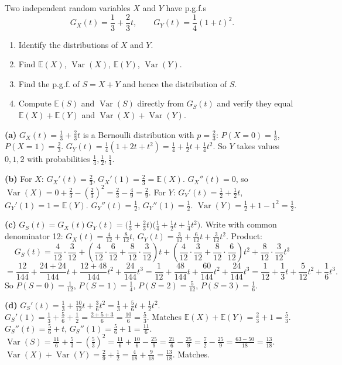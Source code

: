 \documentclass[11pt]{article}
\begin{document}
\begin{exoresolu}
Two independent random variables $X$ and $Y$ have p.g.f.s
\[
G_X(t) = \frac{1}{3} + \frac{2}{3}t, \qquad G_Y(t) = \frac{1}{4}(1+t)^2.
\]
\begin{enumerate}
\item Identify the distributions of $X$ and $Y$.
\item Find $\mathbb{E}(X)$, $\operatorname{Var}(X)$, $\mathbb{E}(Y)$, $\operatorname{Var}(Y)$.
\item Find the p.g.f. of $S=X+Y$ and hence the distribution of $S$.
\item Compute $\mathbb{E}(S)$ and $\operatorname{Var}(S)$ directly from $G_S(t)$ and verify they equal $\mathbb{E}(X)+\mathbb{E}(Y)$ and $\operatorname{Var}(X)+\operatorname{Var}(Y)$.
\end{enumerate}
\tcblower
\textbf{(a)} $G_X(t)=\frac{1}{3}+\frac{2}{3}t$ is a Bernoulli distribution with $p=\frac{2}{3}$: $P(X=0)=\frac{1}{3}$, $P(X=1)=\frac{2}{3}$.
$G_Y(t)=\frac{1}{4}(1+2t+t^2)=\frac{1}{4}+\frac{1}{2}t+\frac{1}{4}t^2$. So $Y$ takes values $0,1,2$ with probabilities $\frac{1}{4},\frac{1}{2},\frac{1}{4}$.

\textbf{(b)} For $X$: $G_X'(t)=\frac{2}{3}$, $G_X'(1)=\frac{2}{3}=\mathbb{E}(X)$. $G_X''(t)=0$, so $\operatorname{Var}(X)=0+\frac{2}{3}-(\frac{2}{3})^2=\frac{2}{3}-\frac{4}{9}=\frac{2}{9}$.
For $Y$: $G_Y'(t)=\frac{1}{2}+\frac{1}{2}t$, $G_Y'(1)=1=\mathbb{E}(Y)$. $G_Y''(t)=\frac{1}{2}$, $G_Y''(1)=\frac{1}{2}$. $\operatorname{Var}(Y)=\frac{1}{2}+1-1^2=\frac{1}{2}$.

\textbf{(c)} $G_S(t)=G_X(t)G_Y(t)=\bigl(\frac{1}{3}+\frac{2}{3}t\bigr)\bigl(\frac{1}{4}+\frac{1}{2}t+\frac{1}{4}t^2\bigr)$.
Write with common denominator 12:
$G_X(t) = \frac{4}{12} + \frac{8}{12}t$, \quad $G_Y(t) = \frac{3}{12} + \frac{6}{12}t + \frac{3}{12}t^2$.
Product:
\[
G_S(t) = \frac{4}{12}\cdot\frac{3}{12} + \left(\frac{4}{12}\cdot\frac{6}{12}+\frac{8}{12}\cdot\frac{3}{12}\right)t + \left(\frac{4}{12}\cdot\frac{3}{12}+\frac{8}{12}\cdot\frac{6}{12}\right)t^2 + \frac{8}{12}\cdot\frac{3}{12}t^3
\]
\[
= \frac{12}{144} + \frac{24+24}{144}t + \frac{12+48}{144}t^2 + \frac{24}{144}t^3
= \frac{1}{12} + \frac{48}{144}t + \frac{60}{144}t^2 + \frac{24}{144}t^3
= \frac{1}{12} + \frac{1}{3}t + \frac{5}{12}t^2 + \frac{1}{6}t^3.
\]
So $P(S=0)=\frac{1}{12}$, $P(S=1)=\frac{1}{4}$, $P(S=2)=\frac{5}{12}$, $P(S=3)=\frac{1}{6}$.

\textbf{(d)} $G_S'(t) = \frac{1}{3} + \frac{10}{12}t + \frac{3}{6}t^2 = \frac{1}{3} + \frac{5}{6}t + \frac{1}{2}t^2$.
$G_S'(1) = \frac{1}{3}+\frac{5}{6}+\frac{1}{2} = \frac{2+5+3}{6} = \frac{10}{6} = \frac{5}{3}$. Matches $\mathbb{E}(X)+\mathbb{E}(Y)=\frac{2}{3}+1=\frac{5}{3}$.
$G_S''(t) = \frac{5}{6} + t$, $G_S''(1) = \frac{5}{6}+1 = \frac{11}{6}$.
$\operatorname{Var}(S) = \frac{11}{6} + \frac{5}{3} - (\frac{5}{3})^2 = \frac{11}{6}+\frac{10}{6}-\frac{25}{9} = \frac{21}{6}-\frac{25}{9} = \frac{7}{2}-\frac{25}{9} = \frac{63-50}{18} = \frac{13}{18}$.
$\operatorname{Var}(X)+\operatorname{Var}(Y) = \frac{2}{9}+\frac{1}{2} = \frac{4}{18}+\frac{9}{18}=\frac{13}{18}$. Matches.
\end{exoresolu}
\end{document}
